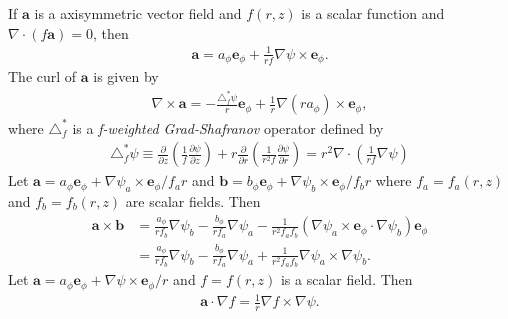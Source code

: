 \documentclass[11pt, reqno]{amsart}
\newcommand{\pfrac}[2]{\frac{\partial #1}{\partial #2}}
\newcommand{\mvec}[1]{\mathbf{#1}}
\newcommand{\eep}{\mvec{e}_\phi}
\theoremstyle{definition}
\begin{document}
If $\mvec{a}$ is a axisymmetric vector field and $f(r,z)$ is a
scalar function and $\nabla \cdot (f\mvec{a}) = 0$, then
\begin{align}
  \mvec{a} = a_\phi \eep + \frac{1}{rf}\nabla\psi \times \eep. \label{id:divAF}
\end{align}
The curl of $\mvec{a}$ is given by
\begin{align}
  \nabla\times\mvec{a} = -\frac{\triangle^*_f\psi}{r}\eep
  + \frac{1}{r} \nabla(ra_\phi)\times\eep, \label{eq:curlaf}
\end{align}
where $\triangle^*_f$ is a \emph{f-weighted Grad-Shafranov} operator
defined by
\begin{align}
  \triangle^*_f\psi \equiv 
  \frac{\partial}{\partial z}\left(\frac{1}{f} \pfrac{\psi}{z}\right)
  + r \frac{\partial}{\partial r}
  \left(\frac{1}{r^2f}\pfrac{\psi}{r}\right)
  =
  r^2\nabla\cdot\left(\frac{1}{rf}\nabla\psi\right)
\end{align}
Let $\mvec{a}=a_\phi\eep + \nabla\psi_a \times \eep/f_ar$ and
$\mvec{b}=b_\phi\eep + \nabla\psi_b \times \eep/f_br$ where
$f_a=f_a(r,z)$ and $f_b=f_b(r,z)$ are scalar fields. Then
\begin{align}
  \mvec{a}\times\mvec{b} &=
  \frac{a_\phi}{rf_b}\nabla\psi_b
  -
  \frac{b_\phi}{rf_a}\nabla\psi_a
  -\frac{1}{r^2f_af_b}(\nabla\psi_a \times \eep \cdot \nabla\psi_b)\eep \\
  &= \frac{a_\phi}{rf_b}\nabla\psi_b
  -
  \frac{b_\phi}{rf_a}\nabla\psi_a
  +\frac{1}{r^2f_af_b}\nabla\psi_a \times \nabla\psi_b. \label{id:acrossb}
\end{align}
Let $\mvec{a}=a_\phi\eep + \nabla\psi \times \eep/r$ and $f=f(r,z)$ is
a scalar field. Then
\begin{align}
  \mvec{a}\cdot\nabla f = \frac{1}{r} \nabla f \times \nabla{\psi}.
  \label{id:aAotGradF}
\end{align}



\end{document}
